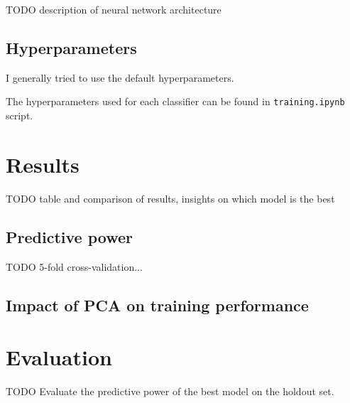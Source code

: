 \documentclass[10pt, twocolumn]{article}
\begin{document}
TODO description of neural network architecture


\subsection{Hyperparameters}
I generally tried to use the default hyperparameters. 

The hyperparameters used for each classifier can be found in \texttt{training.ipynb} script.

\section{Results}
TODO table and comparison of results, insights on which model is the best
\subsection{Predictive power}
TODO 5-fold cross-validation... 

\subsection{Impact of PCA on training performance}

\section{Evaluation}
TODO Evaluate the predictive power of the best model on the holdout set.


\medskip
 


\end{document}
